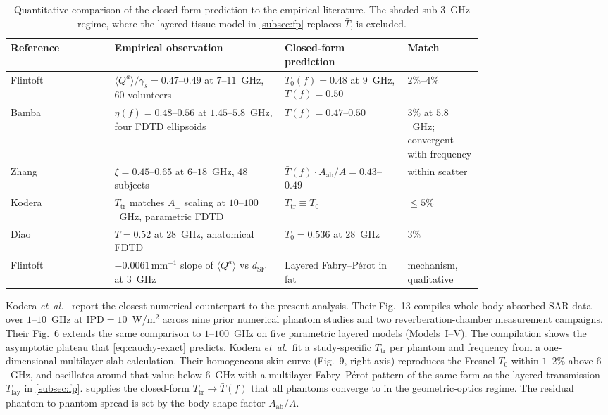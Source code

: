 \documentclass[journal,twocolumn,10pt]{IEEEtran}
\newcommand{\IPD}{\mathrm{IPD}}
\newcommand{\Aab}{A_{\mathrm{ab}}}
\newcommand{\Aperp}{A_\perp}
\newcommand{\Tbar}{\bar{T}}
\newcommand{\Tlay}{T_{\mathrm{lay}}}
\begin{document}
\begin{table}[!t]
\centering
\caption{Quantitative comparison of the closed-form prediction to the
empirical literature. The shaded sub-$3$~GHz regime, where the
layered tissue model in \cref{subsec:fp} replaces $\Tbar$, is
excluded.}
\label{tab:waterfall}
\begin{tabular}{lp{0.36\linewidth}p{0.26\linewidth}p{0.16\linewidth}}
\toprule
Reference & Empirical observation & Closed-form prediction & Match \\
\midrule
Flintoft~\cite{Flintoft2014}
& $\langle Q^a\rangle/\gamma_s = 0.47$--$0.49$ at $7$--$11$~GHz, $60$ volunteers
& $T_0(f) = 0.48$ at $9$~GHz, $\Tbar(f) = 0.50$
& $2\%$--$4\%$ \\
Bamba~\cite{Bamba2014}
& $\eta(f) = 0.48$--$0.56$ at $1.45$--$5.8$~GHz, four FDTD ellipsoids
& $\Tbar(f) = 0.47$--$0.50$
& $3\%$ at $5.8$~GHz; convergent with frequency \\
Zhang~\cite{Zhang2017thesis}
& $\xi = 0.45$--$0.65$ at $6$--$18$~GHz, $48$ subjects
& $\Tbar(f)\cdot\Aab/A = 0.43$--$0.49$
& within scatter \\
Kodera~\cite{Kodera2024}
& $T_{\mathrm{tr}}$ matches $\Aperp$ scaling at $10$--$100$~GHz, parametric FDTD
& $T_{\mathrm{tr}} \equiv T_0$
& $\le 5\%$ \\
Diao~\cite{Diao2024}
& $T = 0.52$ at $28$~GHz, anatomical FDTD
& $T_0 = 0.536$ at $28$~GHz
& $3\%$ \\
Flintoft~\cite{Flintoft2014}
& $-0.0061\,\mathrm{mm}^{-1}$ slope of $\langle Q^a\rangle$ vs $d_{\mathrm{SF}}$ at $3$~GHz
& Layered Fabry--P\'erot in fat
& mechanism, qualitative \\
\bottomrule
\end{tabular}
\end{table}

Kodera \textit{et~al.}~\cite{Kodera2024} report the closest numerical
counterpart to the present analysis. Their Fig.~13 compiles
whole-body absorbed SAR data over $1$--$10$~GHz at
$\IPD = 10$~W/m$^2$ across nine prior numerical phantom studies and
two reverberation-chamber measurement campaigns. Their Fig.~6
extends the same comparison to $1$--$100$~GHz on five parametric
layered models (Models~I--V). The compilation shows the asymptotic
plateau that \eqref{eq:cauchy-exact} predicts. Kodera
\textit{et~al.}\ fit a study-specific $T_{\mathrm{tr}}$ per phantom
and frequency from a one-dimensional multilayer slab calculation.
Their homogeneous-skin curve (Fig.~9, right axis) reproduces the
Fresnel $T_0$ within $1$--$2\%$ above $6$~GHz, and oscillates around
that value below $6$~GHz with a multilayer Fabry--P\'erot pattern of
the same form as the layered transmission $\Tlay$ in
\cref{subsec:fp}.  supplies the closed-form
$T_{\mathrm{tr}} \to \Tbar(f)$ that all phantoms converge to in the
geometric-optics regime. The residual phantom-to-phantom spread is
set by the body-shape factor $\Aab/A$.
\end{document}
